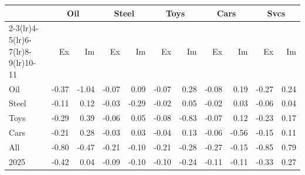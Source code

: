 \begin{tabular}{lrrrrrrrrrr}
\toprule
 & \multicolumn{2}{c}{Oil} & \multicolumn{2}{c}{Steel} & \multicolumn{2}{c}{Toys} & \multicolumn{2}{c}{Cars} & \multicolumn{2}{c}{Svcs} \\
\cmidrule(lr){2-3}\cmidrule(lr){4-5}\cmidrule(lr){6-7}\cmidrule(lr){8-9}\cmidrule(lr){10-11}
 & Ex & Im & Ex & Im & Ex & Im & Ex & Im & Ex & Im \\
\midrule
Oil & -0.37 & -1.04 & -0.07 & 0.09 & -0.07 & 0.28 & -0.08 & 0.19 & -0.27 & 0.24 \\
Steel & -0.11 & 0.12 & -0.03 & -0.29 & -0.02 & 0.05 & -0.02 & 0.03 & -0.06 & 0.04 \\
Toys & -0.29 & 0.39 & -0.06 & 0.05 & -0.08 & -0.83 & -0.07 & 0.12 & -0.23 & 0.17 \\
Cars & -0.21 & 0.28 & -0.03 & 0.03 & -0.04 & 0.13 & -0.06 & -0.56 & -0.15 & 0.11 \\
All & -0.80 & -0.47 & -0.21 & -0.10 & -0.21 & -0.28 & -0.27 & -0.15 & -0.85 & 0.79 \\
2025 & -0.42 & 0.04 & -0.09 & -0.10 & -0.10 & -0.24 & -0.11 & -0.11 & -0.33 & 0.27 \\
\bottomrule
\end{tabular}
